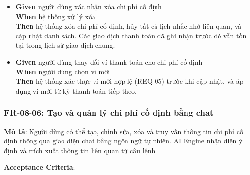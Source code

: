 \begin{itemize}
\item \textbf{Given} người dùng xác nhận xóa chi phí cố định  \\ \hspace*{1.5em}  \textbf{When} hệ thống xử lý xóa  \\ \hspace*{1.5em}  \textbf{Then} hệ thống xóa chi phí cố định, hủy tất cả lịch nhắc nhở liên quan, và cập nhật danh sách. Các giao dịch thanh toán đã ghi nhận trước đó vẫn tồn tại trong lịch sử giao dịch chung.
\item \textbf{Given} người dùng thay đổi ví thanh toán cho chi phí cố định  \\ \hspace*{1.5em}  \textbf{When} người dùng chọn ví mới  \\ \hspace*{1.5em}  \textbf{Then} hệ thống xác thực ví mới hợp lệ (REQ-05) trước khi cập nhật, và áp dụng ví mới từ kỳ thanh toán tiếp theo.
\end{itemize}
\subsubsection{FR-08-06: Tạo và quản lý chi phí cố định bằng chat}

\textbf{Mô tả}: Người dùng có thể tạo, chỉnh sửa, xóa và truy vấn thông tin chi phí cố định thông qua giao diện chat bằng ngôn ngữ tự nhiên. AI Engine nhận diện ý định và trích xuất thông tin liên quan từ câu lệnh.



\textbf{Acceptance Criteria}:

